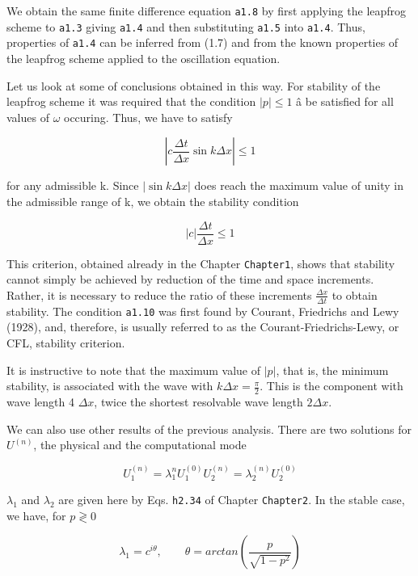 We obtain the same finite difference equation \texttt{a1.8} by first
applying the leapfrog scheme to \texttt{a1.3} giving \texttt{a1.4} and
then substituting \texttt{a1.5} into \texttt{a1.4}. Thus, properties of
\texttt{a1.4} can be inferred from (1.7) and from the known properties
of the leapfrog scheme applied to the oscillation equation.

Let us look at some of conclusions obtained in this way. For stability
of the leapfrog scheme it was required that the condition
\(\left| p \right| \leq 1 \) â be satisfied for all values of \(\omega\)
occuring. Thus, we have to satisfy

\[\left| c\frac{\Delta t}{\Delta x}\sin{k\Delta x } \right| \leq 1\]

for any admissible k. Since \(\left| \sin{k\Delta x} \right|\) does
reach the maximum value of unity in the admissible range of k, we obtain
the stability condition

{\[\left| c \right|\frac{\Delta t}{\Delta x} \leq 1\]}

This criterion, obtained already in the Chapter \texttt{Chapter1}, shows
that stability cannot simply be achieved by reduction of the time and
space increments. Rather, it is necessary to reduce the ratio of these
increments \(\frac{\Delta x}{\Delta t }\) to obtain stability. The
condition \texttt{a1.10} was first found by Courant, Friedrichs and Lewy
(1928), and, therefore, is usually referred to as the
Courant-Friedrichs-Lewy, or CFL, stability criterion.

It is instructive to note that the maximum value of
\(\left| p \right|\), that is, the minimum stability, is associated with
the wave with \(k\Delta x = \frac{\pi}{2}\). This is the component with
wave length 4 \(\Delta x\), twice the shortest resolvable wave length
\(2\Delta x\).

We can also use other results of the previous analysis. There are two
solutions for \(U^{\left( n \right)}\), the physical and the
computational mode

{\[U_{1}^{\left( n \right)} = \lambda_{1}^{n}U_{1}^{\left( 0 \right)}U_{2}^{\left( n \right)} 
= \lambda_{2}^{\left( n \right)}U_{2}^{\left( 0 \right)}\]}

\(\lambda_{1}\) and \(\lambda_{2 }\) are given here by Eqs.
\texttt{h2.34} of Chapter \texttt{Chapter2}. In the stable case, we
have, for \(p \gtrless 0\)

{\[\lambda_{1} = c^{i\theta}, \qquad \theta = arctan\left( \frac{p}{\sqrt{1 - p^{2}}} \right)\]}

